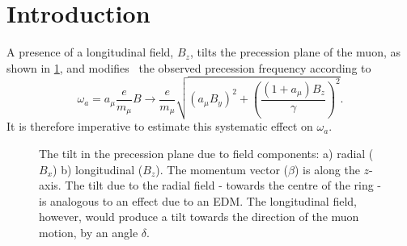 \documentclass[12pt]{article}
\begin{document}
\section{Introduction}
A presence of a longitudinal field, $B_z$, tilts the precession plane of the muon, as shown in \cref{fig:mf_tilt}, and modifies~\cite{Bill} the observed precession frequency according to 
\begin{equation}
  \omega_a= a_{\mu}\frac{e}{m_{\mu}}B \rightarrow \frac{e}{m_{\mu}}  \sqrt{ (a_{\mu}B_y)^2 + \left(\frac{(1+a_{\mu})B_z}{\gamma}\right)^2 }.
\end{equation}
It is therefore imperative to estimate this systematic effect on $\omega_a$.
\vspace{-0.2cm}
\begin{figure}[htpb]
    \centering
    \vspace{-0.2cm}
    \caption{The tilt in the precession plane due to field components: a) radial ($B_x$) b) longitudinal ($B_z$). The momentum vector ($\beta$) is along the $z$-axis. The tilt due to the radial field - towards the centre of the ring - is analogous to an effect due to an EDM. The longitudinal field, however, would produce a tilt towards the direction of the muon motion, by an angle $\delta$.}
    \label{fig:mf_tilt}
\end{figure}
\end{document}
